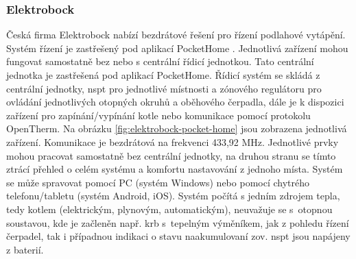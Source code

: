 \subsubsection{Elektrobock}
Česká firma Elektrobock \cite{elektrobock-stranky} nabízí bezdrátové řešení pro řízení podlahové vytápění. Systém řízení je zastřešený pod aplikací PocketHome \cite{pockethome-stranky}. Jednotlivá zařízení mohou fungovat samostatně bez nebo s centrální řídicí jednotkou. Tato centrální jednotka je zastřešená pod aplikací PocketHome. Řídicí systém se skládá z centrální jednotky, \acrshort{nspt} pro jednotlivé místnosti a zónového regulátoru pro ovládání jednotlivých otopných okruhů a oběhového čerpadla, dále je k dispozici zařízení pro zapínání/vypínání kotle nebo komunikace pomocí protokolu OpenTherm. Na obrázku \ref{fig:elektrobock-pocket-home} jsou zobrazena jednotlivá zařízení. Komunikace je bezdrátová na frekvenci 433,92 MHz. Jednotlivé prvky mohou pracovat samostatně bez centrální jednotky, na druhou stranu se tímto ztrácí přehled o celém systému a komfortu nastavování z jednoho místa. Systém se může spravovat pomocí PC (systém Windows) nebo pomocí chytrého telefonu/tabletu (systém Android, iOS). Systém počítá s jedním zdrojem tepla, tedy kotlem (elektrickým, plynovým, automatickým), neuvažuje se s~otopnou soustavou, kde je začleněn např. krb s~tepelným výměníkem, jak z pohledu řízení čerpadel, tak i případnou indikaci o stavu  naakumulovaní \acrshort{zov}. \acrshort{nspt} jsou napájeny z baterií.


